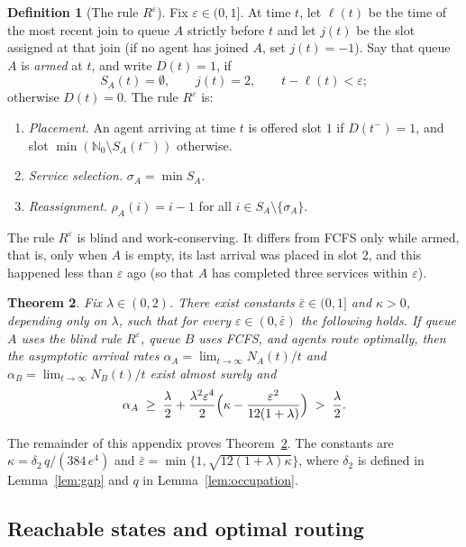 \documentclass[11pt]{article}
\newtheorem{bthm}{Theorem}[section]
\theoremstyle{definition}
\newtheorem{bdef}[bthm]{Definition}
\theoremstyle{remark}
\newcommand{\N}{\mathbb{N}}
\newcommand{\Reps}{R^{\varepsilon}}
\begin{document}
\begin{bdef}[The rule $\Reps$]\label{def:Reps}
Fix $\varepsilon\in(0,1]$. At time $t$, let $\ell(t)$ be the time of the most
recent join to queue $A$ strictly before $t$ and let $j(t)$ be the slot
assigned at that join (if no agent has joined $A$, set $j(t)=-1$). Say that
queue $A$ is \emph{armed} at $t$, and write $D(t)=1$, if
\[
  S_A(t)=\emptyset,\qquad j(t)=2,\qquad t-\ell(t)<\varepsilon ;
\]
otherwise $D(t)=0$. The rule $\Reps$ is:
\begin{enumerate}
\item \emph{Placement.} An agent arriving at time $t$ is offered slot $1$ if
  $D(t^-)=1$, and slot $\min(\N_0\setminus S_A(t^-))$ otherwise.
\item \emph{Service selection.} $\sigma_A=\min S_A$.
\item \emph{Reassignment.} $\rho_A(i)=i-1$ for all $i\in S_A\setminus\{\sigma_A\}$.
\end{enumerate}
\end{bdef}

The rule $\Reps$ is blind and work-conserving. It differs from FCFS only while
armed, that is, only when $A$ is empty, its last arrival was placed in slot $2$,
and this happened less than $\varepsilon$ ago (so that $A$ has completed three
services within $\varepsilon$).

\begin{bthm}\label{thm:blind}
Fix $\lambda\in(0,2)$. There exist constants $\bar\varepsilon\in(0,1]$ and
$\kappa>0$, depending only on $\lambda$, such that for every
$\varepsilon\in(0,\bar\varepsilon)$ the following holds. If queue $A$ uses the
blind rule $\Reps$, queue $B$ uses FCFS, and agents route optimally, then the
asymptotic arrival rates $\alpha_A=\lim_{t\to\infty}N_A(t)/t$ and
$\alpha_B=\lim_{t\to\infty}N_B(t)/t$ exist almost surely and
\[
  \alpha_A\;\ge\;\frac{\lambda}{2}
  +\frac{\lambda^{2}\varepsilon^{4}}{2}
  \Bigl(\kappa-\frac{\varepsilon^{2}}{12(1+\lambda)}\Bigr)\;>\;\frac{\lambda}{2}.
\]
\end{bthm}

The remainder of this appendix proves Theorem~\ref{thm:blind}. The constants
are $\kappa=\delta_2\,q/(384\,e^{4})$ and
$\bar\varepsilon=\min\{1,\sqrt{12(1+\lambda)\kappa}\}$, where $\delta_2$ is
defined in Lemma~\ref{lem:gap} and $q$ in Lemma~\ref{lem:occupation}.

\subsection{Reachable states and optimal routing}
\end{document}
